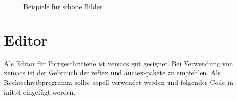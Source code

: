 \begin{figure}
\centering
{}
\caption[Das hier steht im Abbildungsverzeichnis.]{Beispiele f{\"u}r sch{\"o}ne Bilder.\label{fig:bild1-und-bild2}}

\end{figure}


\section{Editor}

Als Editor f{\"u}r Fortgeschrittene ist xemacs gut geeignet.
Bei Verwendung von xemacs ist der Gebrauch der reftex und auctex-pakete zu empfehlen.
Als Rechtschreibprogramm sollte aspell verwendet werden und folgender Code in init.el eingef{\"u}gt werden.



